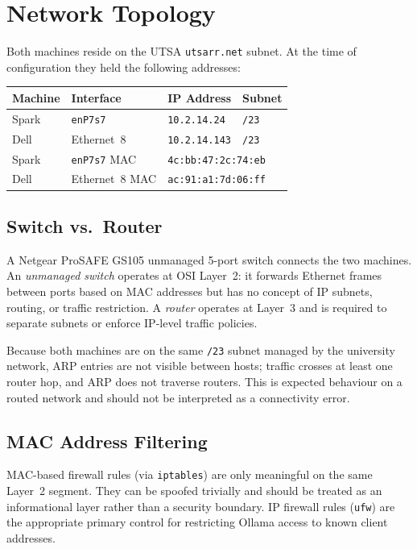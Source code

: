 \section{Network Topology}
\label{sec:network}

Both machines reside on the UTSA \texttt{utsarr.net} subnet. At the time
of configuration they held the following addresses:

\begin{center}
\begin{tabular}{llll}
\toprule
Machine & Interface & IP Address & Subnet \\
\midrule
Spark   & \texttt{enP7s7} & \texttt{10.2.14.24}  & \texttt{/23} \\
Dell    & Ethernet~8      & \texttt{10.2.14.143} & \texttt{/23} \\
\midrule
Spark   & \texttt{enP7s7} MAC & \multicolumn{2}{l}{\texttt{4c:bb:47:2c:74:eb}} \\
Dell    & Ethernet~8 MAC      & \multicolumn{2}{l}{\texttt{ac:91:a1:7d:06:ff}} \\
\bottomrule
\end{tabular}
\end{center}

\subsection{Switch vs.\ Router}

A Netgear ProSAFE GS105 unmanaged 5-port switch connects the two
machines. An \emph{unmanaged switch} operates at OSI Layer~2: it
forwards Ethernet frames between ports based on MAC addresses but has no
concept of IP subnets, routing, or traffic restriction. A
\emph{router} operates at Layer~3 and is required to separate subnets or
enforce IP-level traffic policies.

Because both machines are on the same \texttt{/23} subnet managed by the
university network, ARP entries are not visible between hosts; traffic
crosses at least one router hop, and ARP does not traverse routers. This
is expected behaviour on a routed network and should not be interpreted
as a connectivity error.

\subsection{MAC Address Filtering}

MAC-based firewall rules (via \texttt{iptables}) are only meaningful on
the same Layer~2 segment. They can be spoofed trivially and should be
treated as an informational layer rather than a security boundary. IP
firewall rules (\texttt{ufw}) are the appropriate primary control for
restricting Ollama access to known client addresses.

